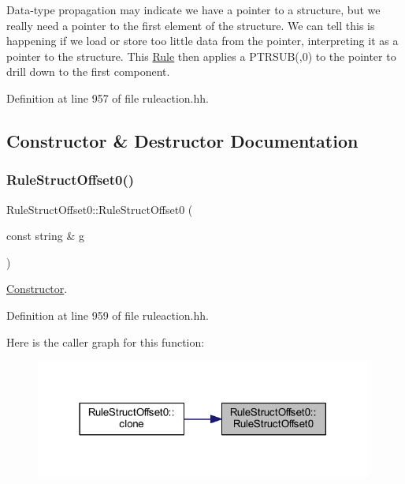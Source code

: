 Data-\/type propagation may indicate we have a pointer to a structure, but we really need a pointer to the first element of the structure. We can tell this is happening if we load or store too little data from the pointer, interpreting it as a pointer to the structure. This \mbox{\hyperlink{class_rule}{Rule}} then applies a P\+T\+R\+S\+U\+B(,0) to the pointer to drill down to the first component. 

Definition at line 957 of file ruleaction.\+hh.



\subsection{Constructor \& Destructor Documentation}
\mbox{\label{class_rule_struct_offset0_acbc30a7691ee47197444a77748f4f92d}} 
\subsubsection{\texorpdfstring{RuleStructOffset0()}{RuleStructOffset0()}}
{\footnotesize\ttfamily Rule\+Struct\+Offset0\+::\+Rule\+Struct\+Offset0 (\begin{DoxyParamCaption}\item[{const string \&}]{g }\end{DoxyParamCaption})\hspace{0.3cm}{\ttfamily [inline]}}



\mbox{\hyperlink{class_constructor}{Constructor}}. 



Definition at line 959 of file ruleaction.\+hh.

Here is the caller graph for this function\+:
\nopagebreak
\begin{figure}[H]
\begin{center}
\leavevmode
\includegraphics[width=314pt]{class_rule_struct_offset0_acbc30a7691ee47197444a77748f4f92d_icgraph}
\end{center}
\end{figure}


